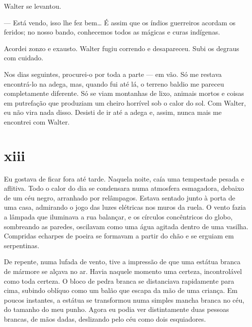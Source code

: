 Walter se levantou.

--- Está vendo, isso lhe fez bem\ldots{} É assim que os índios guerreiros
    acordam os feridos; no nosso bando, conhecemos todos as mágicas e curas
    indígenas.

Acordei zonzo e exausto. Walter fugiu correndo e desapareceu. Subi os degraus
com cuidado.

Nos dias seguintes, procurei-o por toda a parte --- em vão. Só me restava
encontrá-lo na adega, mas, quando fui até lá, o terreno baldio me pareceu
completamente diferente. Só se viam montanhas de lixo, animais mortos e
coisas em putrefação que produziam um cheiro horrível sob o calor do sol. Com
Walter, eu não vira nada disso. Desisti de ir até a adega e, assim, nunca
mais me encontrei com Walter.


\section{xiii} 

 

Eu gostava de ficar fora até tarde. Naquela noite, caía uma tempestade pesada
e aflitiva. Todo o calor do dia se condensara numa atmosfera esmagadora,
debaixo de um céu negro, arranhado por relâmpagos. Estava sentado junto à
porta de uma casa, admirando o jogo das luzes elétricas nos muros da ruela. O
vento fazia a lâmpada que iluminava a rua balançar, e os círculos
concêntricos do globo, sombreando as paredes, oscilavam como uma água agitada
dentro de uma vasilha. Compridas echarpes de poeira se formavam a partir do
chão e se erguiam em serpentinas.

De repente, numa lufada de vento, tive a impressão de que uma estátua branca
de mármore se alçava no ar. Havia naquele momento uma certeza, incontrolável
como toda certeza. O bloco de pedra branca se distanciava rapidamente para
cima, subindo oblíquo como um balão que escapa da mão de uma criança. Em
poucos instantes, a estátua se transformou numa simples mancha branca no céu,
do tamanho do meu punho. Agora eu podia ver distintamente duas pessoas
brancas, de mãos dadas, deslizando pelo céu como dois esquiadores.

